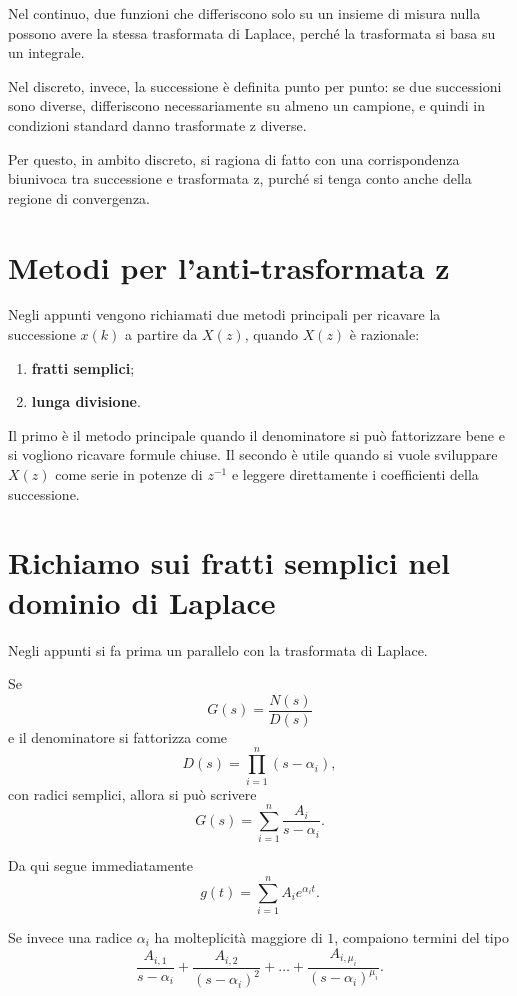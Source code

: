 Nel continuo, due funzioni che differiscono solo su un insieme di misura nulla
possono avere la stessa trasformata di Laplace, perch\'e la trasformata si basa su un integrale.

Nel discreto, invece, la successione \`e definita punto per punto:
se due successioni sono diverse, differiscono necessariamente su almeno un campione,
e quindi in condizioni standard danno trasformate z diverse.

Per questo, in ambito discreto, si ragiona di fatto con una corrispondenza biunivoca
tra successione e trasformata z, purch\'e si tenga conto anche della regione di convergenza.

\section{Metodi per l'anti-trasformata z}

Negli appunti vengono richiamati due metodi principali per ricavare la successione \(x(k)\)
a partire da \(X(z)\), quando \(X(z)\) \`e razionale:

\begin{enumerate}
    \item \textbf{fratti semplici};
    \item \textbf{lunga divisione}.
\end{enumerate}

Il primo \`e il metodo principale quando il denominatore si pu\`o fattorizzare bene
e si vogliono ricavare formule chiuse.
Il secondo \`e utile quando si vuole sviluppare \(X(z)\) come serie in potenze di \(z^{-1}\)
e leggere direttamente i coefficienti della successione.

\section{Richiamo sui fratti semplici nel dominio di Laplace}

Negli appunti si fa prima un parallelo con la trasformata di Laplace.

Se
\[
G(s)=\frac{N(s)}{D(s)}
\]
e il denominatore si fattorizza come
\[
D(s)=\prod_{i=1}^{n}(s-\alpha_i),
\]
con radici semplici, allora si pu\`o scrivere
\[
G(s)=\sum_{i=1}^{n}\frac{A_i}{s-\alpha_i}.
\]

Da qui segue immediatamente
\[
g(t)=\sum_{i=1}^{n} A_i e^{\alpha_i t}.
\]

Se invece una radice \(\alpha_i\) ha molteplicit\`a maggiore di \(1\), compaiono termini del tipo
\[
\frac{A_{i,1}}{s-\alpha_i}+\frac{A_{i,2}}{(s-\alpha_i)^2}+\dots+\frac{A_{i,\mu_i}}{(s-\alpha_i)^{\mu_i}}.
\]


